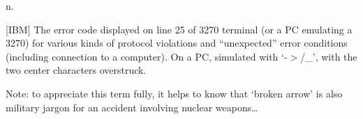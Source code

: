  n.

[IBM] The error code displayed on line 25 of 3270 terminal (or a PC emulating a
3270) for various kinds of protocol violations and ``unexpected'' error
conditions (including connection to a  computer). On a PC,
simulated with `-$>$/\_', with the two center characters overstruck.

Note: to appreciate this term fully, it helps to know that `broken arrow' is
also military jargon for an accident involving nuclear weapons\dots

